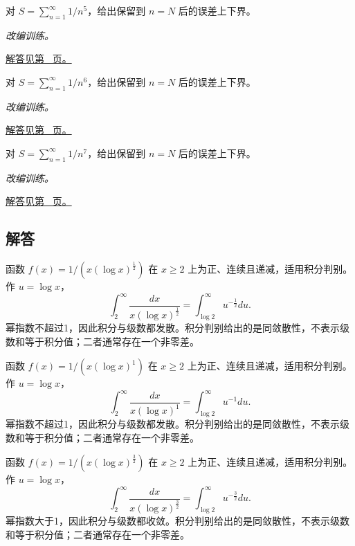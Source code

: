 \documentclass[12pt,fontset=fandol]{ctexart}
\begin{document}
\begin{example}[正项级数的尾和积分界]\label{ex:c25q22}
对 $S=\sum_{n=1}^\infty1/n^{5}$，给出保留到 $n=N$ 后的误差上下界。
\par\textit{改编训练。}\par\hyperref[ans:c25q22]{解答见第~\pageref{ans:c25q22} 页。}
\end{example}
\begin{example}[正项级数的尾和积分界]\label{ex:c25q23}
对 $S=\sum_{n=1}^\infty1/n^{6}$，给出保留到 $n=N$ 后的误差上下界。
\par\textit{改编训练。}\par\hyperref[ans:c25q23]{解答见第~\pageref{ans:c25q23} 页。}
\end{example}
\begin{example}[正项级数的尾和积分界]\label{ex:c25q24}
对 $S=\sum_{n=1}^\infty1/n^{7}$，给出保留到 $n=N$ 后的误差上下界。
\par\textit{改编训练。}\par\hyperref[ans:c25q24]{解答见第~\pageref{ans:c25q24} 页。}
\end{example}
\subsection{解答}
\begin{solve}\label{ans:c25q1}
函数 $f(x)=1/(x(\log x)^{\frac{1}{2}})$ 在 $x\ge2$ 上为正、连续且递减，适用积分判别。作 $u=\log x$，
\[
\int_2^\infty\frac{dx}{x(\log x)^{\frac{1}{2}}}=\int_{\log2}^\infty u^{-\frac{1}{2}}du.
\]
幂指数不超过1，因此积分与级数都发散。积分判别给出的是同敛散性，不表示级数和等于积分值；二者通常存在一个非零差。
\end{solve}

\begin{solve}\label{ans:c25q2}
函数 $f(x)=1/(x(\log x)^{1})$ 在 $x\ge2$ 上为正、连续且递减，适用积分判别。作 $u=\log x$，
\[
\int_2^\infty\frac{dx}{x(\log x)^{1}}=\int_{\log2}^\infty u^{-1}du.
\]
幂指数不超过1，因此积分与级数都发散。积分判别给出的是同敛散性，不表示级数和等于积分值；二者通常存在一个非零差。
\end{solve}

\begin{solve}\label{ans:c25q3}
函数 $f(x)=1/(x(\log x)^{\frac{3}{2}})$ 在 $x\ge2$ 上为正、连续且递减，适用积分判别。作 $u=\log x$，
\[
\int_2^\infty\frac{dx}{x(\log x)^{\frac{3}{2}}}=\int_{\log2}^\infty u^{-\frac{3}{2}}du.
\]
幂指数大于1，因此积分与级数都收敛。积分判别给出的是同敛散性，不表示级数和等于积分值；二者通常存在一个非零差。
\end{solve}
\end{document}
